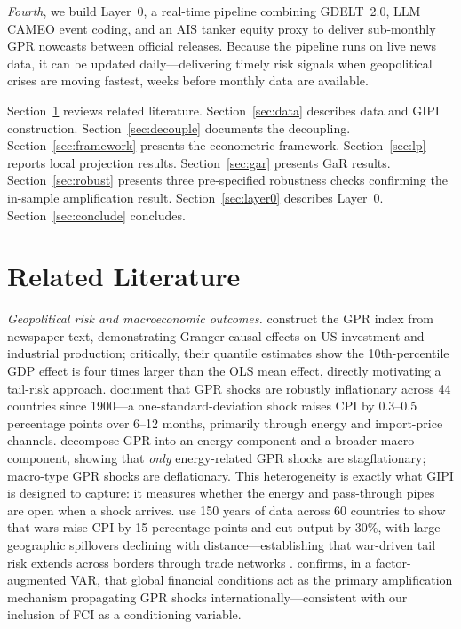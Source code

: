 \documentclass[12pt]{article}
\begin{document}
\textit{Fourth}, we build Layer~0, a real-time pipeline combining GDELT~2.0,
LLM CAMEO event coding, and an AIS tanker equity proxy to deliver sub-monthly
GPR nowcasts between official releases.
Because the pipeline runs on live news data, it can be updated daily---delivering
timely risk signals when geopolitical crises are moving fastest, weeks before
monthly data are available.

\medskip
Section~\ref{sec:lit} reviews related literature.
Section~\ref{sec:data} describes data and GIPI construction.
Section~\ref{sec:decouple} documents the decoupling.
Section~\ref{sec:framework} presents the econometric framework.
Section~\ref{sec:lp} reports local projection results.
Section~\ref{sec:gar} presents GaR results.
Section~\ref{sec:robust} presents three pre-specified robustness checks
confirming the in-sample amplification result.
Section~\ref{sec:layer0} describes Layer~0.
Section~\ref{sec:conclude} concludes.


\section{Related Literature}\label{sec:lit}

\noindent\textit{Geopolitical risk and macroeconomic outcomes.}
\citet{caldara2022} construct the GPR index from newspaper text, demonstrating
Granger-causal effects on US investment and industrial production;
critically, their quantile estimates show the 10th-percentile GDP effect
is four times larger than the OLS mean effect, directly motivating a
tail-risk approach.
\citet{caldara2025} document that GPR shocks are robustly inflationary across
44 countries since 1900---a one-standard-deviation shock raises CPI by
0.3--0.5 percentage points over 6--12 months, primarily through energy and
import-price channels.
\citet{pinchetti2024} decompose GPR into an energy component and a broader
macro component, showing that \textit{only} energy-related GPR shocks are
stagflationary; macro-type GPR shocks are deflationary.
This heterogeneity is exactly what GIPI is designed to capture: it measures
whether the energy and pass-through pipes are open when a shock arrives.
\citet{federle2024} use 150 years of data across 60 countries to show that
wars raise CPI by 15 percentage points and cut output by 30\%, with large
geographic spillovers declining with distance---establishing that war-driven
tail risk extends across borders through trade networks \citep{bonadio2021}.
\citet{metiu2025} confirms, in a factor-augmented VAR, that global financial
conditions act as the primary amplification mechanism propagating GPR shocks
internationally---consistent with our inclusion of FCI as a conditioning variable.
\end{document}
